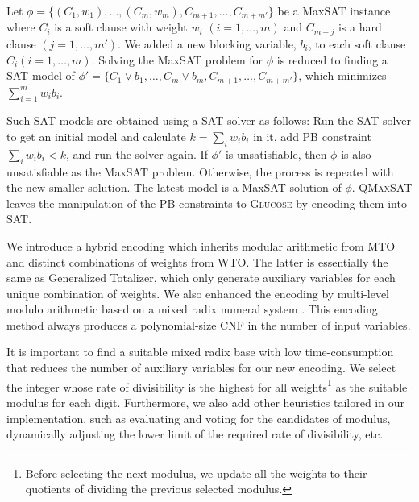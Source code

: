 \documentclass[conference]{IEEEtran}
\begin{document}
Let $\phi=
\{(C_{1},w_{1}),\dots,(C_{m},w_{m}),C_{m+1},\dots,C_{m+m'}\}$ be a
MaxSAT \cite{li2009maxsat} instance where $C_{i}$ is a soft clause with weight
$w_{i}$ $(i = 1,\dots,m)$ and $C_{m+j}$ is a hard
clause $(j = 1,\dots,m')$.
We added a new blocking variable, $b_{i}$, to each soft clause $C_{i} (i
= 1,\dots,m)$.
Solving the MaxSAT problem for $\phi$ is reduced to
finding a SAT model of
$\phi' = \{C_{1}\vee b_{1},\dots,C_{m}\vee b_{m},C_{m+1},\dots,C_{m+m'}\}$, 
which minimizes $\sum_{i=1}^{m} w_{i}b_{i}$.

Such SAT models are obtained using a SAT solver as follows:
Run the SAT solver to get an initial model and calculate
$k = \sum_{i} w_{i}b_{i}$ in it,
add PB constraint $\sum_{i} w_{i}b_{i} < k$,
and run the solver again. If $\phi'$ is unsatisfiable,
then $\phi$ is also unsatisfiable as the MaxSAT problem.
Otherwise, the process is repeated with the new smaller solution.
The latest model is a MaxSAT solution of $\phi$.
\textsc{QMaxSAT} leaves the manipulation of the PB constraints to \textsc{Glucose} by 
encoding them into SAT.

We introduce a hybrid encoding 
\cite{DBLP:conf/taai/ZhaAhyb} which inherits 
modular arithmetic from MTO and distinct combinations of weights from WTO. 
The latter is essentially the same as Generalized Totalizer, which 
only generate auxiliary variables for each unique combination of weights. 
We also enhanced the encoding by multi-level modulo 
arithmetic based on a mixed radix numeral system \cite{DBLP:conf/ictai/Zhamix13}. 
This encoding method always produces a polynomial-size CNF in the number of input variables. 

It is important to find a suitable mixed radix base with low time-consumption 
that reduces the number of auxiliary variables for our new encoding. 
We select the integer whose rate of divisibility is the highest for all weights\footnote{
Before selecting the next modulus, we update all the weights to their quotients of dividing 
the previous selected modulus. 
} as the suitable modulus for each digit. Furthermore, 
we also add other heuristics tailored in our implementation, such as evaluating and 
voting for the candidates of modulus, dynamically adjusting the lower limit of the 
required rate of divisibility, etc. 



\end{document}
